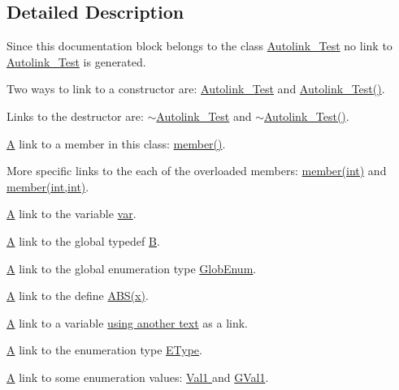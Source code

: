 \subsection{Detailed Description}
Since this documentation block belongs to the class \hyperlink{class_autolink___test}{Autolink\+\_\+\+Test} no link to \hyperlink{class_autolink___test}{Autolink\+\_\+\+Test} is generated.

Two ways to link to a constructor are\+: \hyperlink{class_autolink___test}{Autolink\+\_\+\+Test} and \hyperlink{class_autolink___test_a4d8de7614847eca2cbaad61f4a8f0f15}{Autolink\+\_\+\+Test()}.

Links to the destructor are\+: \hyperlink{class_autolink___test_a53069f9df63c2d47097eb12ea14796f5}{$\sim$\+Autolink\+\_\+\+Test} and \hyperlink{class_autolink___test_a53069f9df63c2d47097eb12ea14796f5}{$\sim$\+Autolink\+\_\+\+Test()}.

\hyperlink{class_a}{A} link to a member in this class\+: \hyperlink{class_autolink___test_a3b57d2ff9a1488b8e434478eb77e7846}{member()}.

More specific links to the each of the overloaded members\+: \hyperlink{class_autolink___test_a3b57d2ff9a1488b8e434478eb77e7846}{member(int)} and \hyperlink{class_autolink___test_afbb46725b4cc672dbf7b52051ec6df8d}{member(int,int)}.

\hyperlink{class_a}{A} link to the variable \hyperlink{class_autolink___test_a96c77f9f3a7baec84b9b8add26a31787}{var}.

\hyperlink{class_a}{A} link to the global typedef \hyperlink{class_b}{B}.

\hyperlink{class_a}{A} link to the global enumeration type \hyperlink{autolink_8cpp_a656d63cf384d2a6f23c2c18523a7bc5e}{Glob\+Enum}.

\hyperlink{class_a}{A} link to the define \hyperlink{define_8h_a996f7be338ccb40d1a2a5abc1ad61759}{A\+B\+S(x)}.

\hyperlink{class_a}{A} link to a variable \hyperlink{class_autolink___test_a96c77f9f3a7baec84b9b8add26a31787}{using another text} as a link.

\hyperlink{class_a}{A} link to the enumeration type \hyperlink{class_autolink___test_ad5d0e87f61ba99c47a539492df7917a1}{E\+Type}.

\hyperlink{class_a}{A} link to some enumeration values\+: \hyperlink{class_autolink___test_ad5d0e87f61ba99c47a539492df7917a1a06bb6ba8ccdce459e14c7a917b07f6e4}{Val1 } and \hyperlink{autolink_8cpp_a656d63cf384d2a6f23c2c18523a7bc5ea0f016f49e4f3bcd072319b9d68bc927d}{G\+Val1}.

